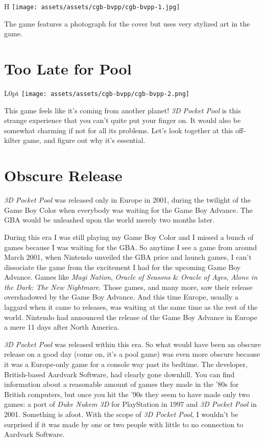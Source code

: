 \documentclass{book}
\begin{document}
\begin{wrapfigure}{H}{\linewidth}
\vskip 4pt
\centering \texttt{[image: assets/assets/cgb-bvpp/cgb-bvpp-1.jpg]}\par\pagetwodescription The game features a photograph for the cover but uses very stylized art in the game.\end{wrapfigure}
\clearpage

\FloatBarrier\needspace{5pt}\section*{Too Late for Pool}\nopagebreak[4]

\begin{wrapfigure}{L}{0pt} \texttt{[image: assets/assets/cgb-bvpp/cgb-bvpp-2.png]}\end{wrapfigure}
This game feels like it’s coming from another planet! \emph{3D Pocket Pool} is this strange experience that you can’t quite put your finger on. It would also be somewhat charming if not for all its problems. Let’s look together at this off-kilter game, and figure out why it’s essential.

\FloatBarrier\needspace{5pt}\section*{Obscure Release}\nopagebreak[4]

\emph{3D Pocket Pool} was released only in Europe in 2001, during the twilight of the Game Boy Color when everybody was waiting for the Game Boy Advance. The GBA would be unleashed upon the world merely two months later.

During this era I was still playing my Game Boy Color and I missed a bunch of games because I was waiting for the GBA. So anytime I see a game from around March 2001, when Nintendo unveiled the GBA price and launch games, I can’t dissociate the game from the excitement I had for the upcoming Game Boy Advance. Games like \emph{Magi Nation}, \emph{Oracle of Seasons} \& \emph{Oracle of Ages}, \emph{Alone in the Dark: The New Nightmare}. Those games, and many more, saw their release overshadowed by the Game Boy Advance. And this time Europe, usually a laggard when it came to releases, was waiting at the same time as the rest of the world. Nintendo had announced the release of the Game Boy Advance in Europe a mere 11 days after North America.

\emph{3D Pocket Pool} was released within this era. So what would have been an obscure release on a good day (come on, it’s a pool game) was even more obscure because it was a Europe-only game for a console way past its bedtime. The developer, British-based Aardvark Software, had clearly gone downhill. You can find information about a reasonable amount of games they made in the ’80s for British computers, but once you hit the ’90s they seem to have made only two games: a port of \emph{Duke Nukem 3D} for PlayStation in 1997 and \emph{3D Pocket Pool} in 2001. Something is afoot. With the scope of \emph{3D Pocket Pool}, I wouldn’t be surprised if it was made by one or two people with little to no connection to Aardvark Software.
\end{document}
